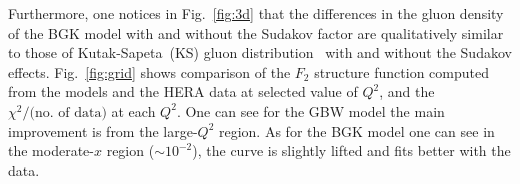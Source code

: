 \documentclass{appolb}
\begin{document}
Furthermore, one notices in Fig.~\ref{fig:3d} that the differences in the gluon density of the BGK model with and without the Sudakov factor are qualitatively similar to those of Kutak-Sapeta~(KS) gluon distribution~\cite{vanHameren:2020rqt} with and without the Sudakov effects.
Fig.~\ref{fig:grid} shows comparison of the $ F_2$ structure function computed from the models and the HERA data at selected value of $Q^2$, and the $\chi^2/\text{(no. of data)}$ at each $Q^2$. One can see for the GBW model the main improvement is from the large-$Q^2$ region. As for the BGK model one can see in the moderate-$x$ region ($\sim 10^{-2}$), the curve is slightly lifted and fits better with the data.  
%
\end{document}
